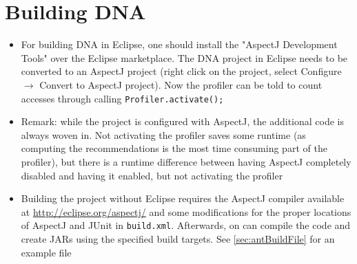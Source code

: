 \section{Building DNA}
	\begin{itemize}
		\item For building DNA in Eclipse, one should install the "AspectJ Development Tools"
			over the Eclipse marketplace. The DNA project in Eclipse needs to be converted to an
			AspectJ project (right click on the project, select Configure $\rightarrow$ Convert to
			AspectJ project). Now the profiler can be told to count accesses through calling
			\texttt{Profiler.\allowbreak activate();}
		\item Remark: while the project is configured with AspectJ, the additional code is
			always woven in. Not activating the profiler saves some runtime (as computing the
			recommendations is the most time consuming part of the profiler), but there is a
			runtime difference between having AspectJ completely disabled and having it enabled,
			but not activating the profiler
		\item Building the project without Eclipse requires the AspectJ compiler available at
			\url{http://eclipse.org/aspectj/} and some modifications for the proper locations of
			AspectJ and JUnit in \texttt{build.xml}. Afterwards, on can compile the code and create
			JARs using the specified build targets. See \ref{sec:antBuildFile} for an example file
	\end{itemize}
